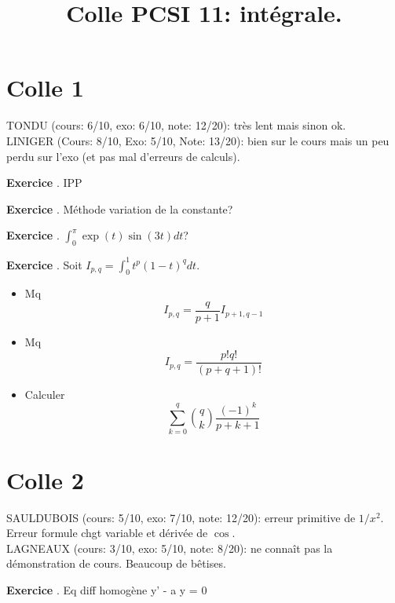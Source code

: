 \documentclass[10pt,a4paper]{article}
\title{Colle PCSI 11: intégrale.}
\newcounter{question}
\newcounter{exo}
\newenvironment{exo}{\vspace{0.5cm}\setcounter{question}{0}\addtocounter{exo}{1} \noindent \textbf{Exercice \theexo}. \normalsize }{\par}
\begin{document}
	\maketitle
	
	
	\section*{Colle 1}
	\setcounter{exo}{0}
	TONDU (cours: 6/10, exo: 6/10, note: 12/20): très lent mais sinon ok.\\
	LINIGER (Cours: 8/10, Exo: 5/10, Note: 13/20): bien sur le cours mais un peu perdu sur l'exo (et pas mal d'erreurs de calculs).\\
	
	\begin{exo}
		IPP
	\end{exo}
	
	\begin{exo}
		Méthode variation de la constante?
	\end{exo}
	
	\begin{exo}
		$\int_{0}^{\pi} \exp(t) \sin(3t) dt$?
	\end{exo}	
	
	\begin{exo}
		Soit $I_{p, q} = \int_{0}^{1} t^p (1 - t)^q dt$. 
		\begin{itemize}
			\item Mq $$I_{p, q} = \frac{q}{p+1} I_{p+1, q-1}$$
			\item Mq $$I_{p, q} = \frac{p! q!}{(p+q+1)!}$$
			\item Calculer $$\sum_{k=0}^{q} \binom{q}{k} \frac{(-1)^k}{p+k+1}$$
		\end{itemize}
	\end{exo}
	
	\section*{Colle 2}
	\setcounter{exo}{0}
	SAULDUBOIS (cours: 5/10, exo: 7/10, note: 12/20): erreur primitive de $1/x^2$. Erreur formule chgt variable et dérivée de $\cos$.\\
	LAGNEAUX (cours: 3/10, exo: 5/10, note: 8/20): ne connaît pas la démonstration de cours. Beaucoup de bêtises.\\
	
	\begin{exo}
		Eq diff homogène y' - a y = 0
	\end{exo}
\end{document}
